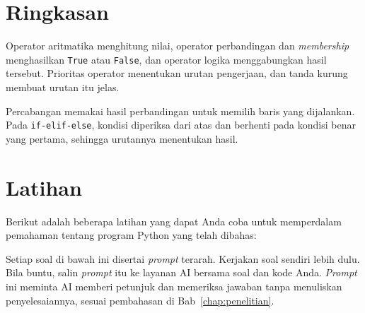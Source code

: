 \section{Ringkasan}
Operator aritmatika menghitung nilai, operator perbandingan dan \textit{membership} menghasilkan \texttt{True} atau \texttt{False}, dan operator logika menggabungkan hasil tersebut. Prioritas operator menentukan urutan pengerjaan, dan tanda kurung membuat urutan itu jelas.

Percabangan memakai hasil perbandingan untuk memilih baris yang dijalankan. Pada \texttt{if-elif-else}, kondisi diperiksa dari atas dan berhenti pada kondisi benar yang pertama, sehingga urutannya menentukan hasil.

\section{Latihan}
Berikut adalah beberapa latihan yang dapat Anda coba untuk memperdalam pemahaman tentang program Python yang telah dibahas:

Setiap soal di bawah ini disertai \textit{prompt} terarah. Kerjakan soal sendiri lebih dulu. Bila buntu, salin \textit{prompt} itu ke layanan AI bersama soal dan kode Anda. \textit{Prompt} ini meminta AI memberi petunjuk dan memeriksa jawaban tanpa menuliskan penyelesaiannya, sesuai pembahasan di Bab~\ref{chap:penelitian}.

